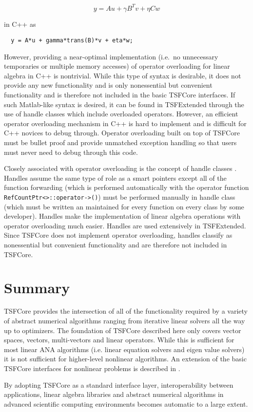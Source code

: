 \[
y = A u + \gamma B^T v + \eta C w
\]

{}\noindent{}in C++ as

\begin{verbatim}
  y = A*u + gamma*trans(B)*v + eta*w;
\end{verbatim}

{}\noindent{}However, providing a near-optimal implementation (i.e.~no
unnecessary temporaries or multiple memory accesses) of operator
overloading for linear algebra in C++ is nontrivial.  While this type
of syntax is desirable, it does not provide any new functionality and
is only nonessential but convenient functionality and is therefore not
included in the basic TSFCore interfaces.  If such Matlab-like syntax
is desired, it can be found in TSFExtended through the use of handle
classes which include overloaded operators.  However, an efficient
operator overloading mechanism in C++ is hard to implement and is
difficult for C++ novices to debug through.  Operator overloading
built on top of TSFCore must be bullet proof and provide unmatched
exception handling so that users must never need to debug through this
code.

Closely associated with operator overloading is the concept of handle
classes {}\cite{ref:advanced_c++_coplien}.  Handles assume the same
type of role as a smart pointers except all of the function forwarding
(which is performed automatically with the operator function
{}\texttt{RefCountPtr<>\-::operator->()}) must be performed manually
in handle class (which must be written an maintained for every function
on every class by some developer).  Handles make the implementation of
linear algebra operations with operator overloading much easier.
Handles are used extensively in TSFExtended.  Since TSFCore does not
implement operator overloading, handles classify as nonessential but
convenient functionality and are therefore not included in TSFCore.

%
\section{Summary}
%

TSFCore provides the intersection of all of the functionality required
by a variety of abstract numerical algorithms ranging from iterative
linear solvers all the way up to optimizers.  The foundation of
TSFCore described here only covers vector spaces, vectors,
multi-vectors and linear operators.  While this is sufficient for most
linear ANA algorithms (i.e. linear equation solvers and eigen value
solvers) it is not sufficient for higher-level nonlinear algorithms.
An extension of the basic TSFCore interfaces for nonlinear problems is
described in {}\cite{ref:TSFCore::Nonlin}.

By adopting TSFCore as a standard interface layer, interoperability
between applications, linear algebra libraries and abstract numerical
algorithms in advanced scientific computing environments becomes
automatic to a large extent.

